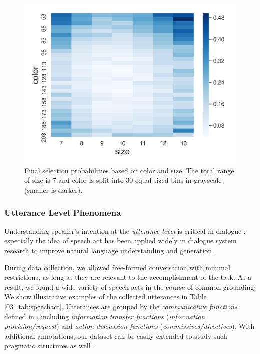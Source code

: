 \begin{figure}[t!]
\centering
\includegraphics[width=0.74\columnwidth]{selection_bias.pdf}
\caption{
Final selection probabilities based on color and size. The total range of size is 7 and color is split into 30 equal-sized bins in grayscale (smaller is darker).
}
\label{03_fig:plot-select}
\end{figure}

\subsubsection{Utterance Level Phenomena}

Understanding speaker's intention at the \emph{utterance level} is critical in dialogue \citep{grice1957meaning}: especially the idea of speech act \citep{austin1962things,searle1969speech} has been applied widely in dialogue system research to improve natural language understanding and generation \citep{yao2013recurrent,hakkani2016multi}.

During data collection, we allowed free-formed conversation with minimal restrictions, as long as they are relevant to the accomplishment of the task. As a result, we found a wide variety of speech acts in the course of common grounding. We show illustrative examples of the collected utterances in Table \ref{03_tab:speechact}. Utterances are grouped by the \textit{communicative functions} defined in \citet{bunt2017dialogue}, including \textit{information transfer functions} (\textit{information provision/request}) and \textit{action discussion functions} (\textit{commissives/directives}). With additional annotations, our dataset can be easily extended to study such pragmatic structures as well \citep{stolcke-etal-2000-dialogue}.

